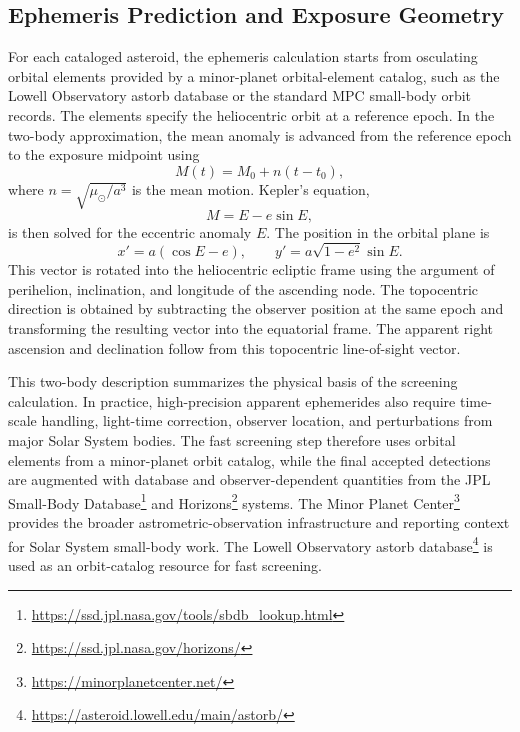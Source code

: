 \documentclass[referee]{raa}
\begin{document}
\subsection{Ephemeris Prediction and Exposure Geometry}

For each cataloged asteroid, the ephemeris calculation starts from osculating orbital elements provided by a minor-planet orbital-element catalog, such as the Lowell Observatory astorb database or the standard MPC small-body orbit records. The elements specify the heliocentric orbit at a reference epoch. In the two-body approximation, the mean anomaly is advanced from the reference epoch to the exposure midpoint using
\begin{equation}
M(t)=M_0+n(t-t_0),
\end{equation}
where \(n=\sqrt{\mu_{\odot}/a^3}\) is the mean motion. Kepler's equation,
\begin{equation}
M=E-e\sin E,
\end{equation}
is then solved for the eccentric anomaly \(E\). The position in the orbital plane is
\begin{equation}
x'=a(\cos E-e), \qquad
y'=a\sqrt{1-e^2}\sin E .
\end{equation}
This vector is rotated into the heliocentric ecliptic frame using the argument of perihelion, inclination, and longitude of the ascending node. The topocentric direction is obtained by subtracting the observer position at the same epoch and transforming the resulting vector into the equatorial frame. The apparent right ascension and declination follow from this topocentric line-of-sight vector.

This two-body description summarizes the physical basis of the screening calculation. In practice, high-precision apparent ephemerides also require time-scale handling, light-time correction, observer location, and perturbations from major Solar System bodies. The fast screening step therefore uses orbital elements from a minor-planet orbit catalog, while the final accepted detections are augmented with database and observer-dependent quantities from the JPL Small-Body Database\footnote{\url{https://ssd.jpl.nasa.gov/tools/sbdb_lookup.html}} and Horizons\footnote{\url{https://ssd.jpl.nasa.gov/horizons/}} systems. The Minor Planet Center\footnote{\url{https://minorplanetcenter.net/}} provides the broader astrometric-observation infrastructure and reporting context for Solar System small-body work. The Lowell Observatory astorb database\footnote{\url{https://asteroid.lowell.edu/main/astorb/}} is used as an orbit-catalog resource for fast screening.
\end{document}
